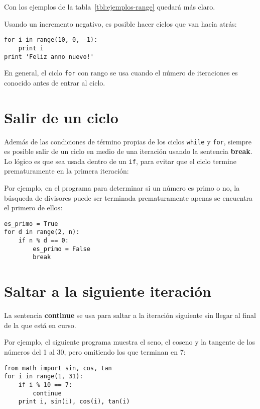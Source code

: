 Con los ejemplos de la tabla~\ref{tbl:ejemplos-range} quedará más claro.

Usando un incremento negativo, es posible hacer ciclos que van hacia
atrás:

\begin{lstlisting}
for i in range(10, 0, -1):
    print i
print 'Feliz anno nuevo!'
\end{lstlisting}

En general, el ciclo \lstinline!for! con rango se usa cuando el número
de iteraciones es conocido antes de entrar al ciclo.

\section{Salir de un ciclo}

Además de las condiciones de término propias de los ciclos
\lstinline!while! y \lstinline!for!, siempre es posible salir de un
ciclo en medio de una iteración usando la sentencia \textbf{break}. Lo
lógico es que sea usada dentro de un \lstinline!if!, para evitar que el
ciclo termine prematuramente en la primera iteración:

\begin{center}
  
\end{center}

Por ejemplo, en el programa para determinar si un número es primo o no,
la búsqueda de divisores puede ser terminada prematuramente apenas se
encuentra el primero de ellos:

\begin{lstlisting}
es_primo = True
for d in range(2, n):
    if n % d == 0:
        es_primo = False
        break
\end{lstlisting}

\section{Saltar a la siguiente iteración}

La sentencia \textbf{continue} se usa para saltar a la iteración
siguiente sin llegar al final de la que está en curso.

\begin{center}
  
\end{center}

Por ejemplo, el siguiente programa muestra el seno, el coseno y la
tangente de los números del 1 al 30, pero omitiendo los que terminan en
7:

\begin{lstlisting}
from math import sin, cos, tan
for i in range(1, 31):
    if i % 10 == 7:
        continue
    print i, sin(i), cos(i), tan(i)
\end{lstlisting}

